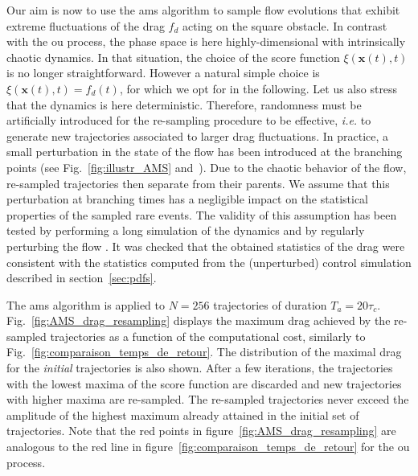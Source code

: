\documentclass{jfm}
\newcommand{\EL}[1]{{\color{myred}{#1}}}
\begin{document}
% 
% 
Our aim is now to use the \ac{ams} algorithm to sample flow evolutions that exhibit extreme fluctuations of the drag $f_d$ acting on the square obstacle.
In contrast with the \acl{ou} process, the phase space is here highly-dimensional with intrinsically chaotic dynamics.
In that situation, the choice of the score function $\xi (\mathbf{x}(t),t)$ is no longer straightforward.
However a natural simple choice is $\xi (\mathbf{x}(t),t) = f_d(t)$, for which we opt for in the following.
% 
{Let us also stress that the dynamics is here deterministic.
  Therefore, randomness must be artificially introduced for the re-sampling procedure to be effective, \textit{i.e.} to generate new trajectories associated to larger drag fluctuations.
  In practice, a small perturbation in the state of the flow has been introduced at the branching points (see Fig.~\ref{fig:illustr_AMS} and~\cite{wouters2016rare}).
  Due to the chaotic behavior of the flow, re-sampled trajectories then separate from their parents.
  We assume that this perturbation at branching times has a negligible impact on the statistical properties of the sampled rare events.
  The validity of this assumption has been tested by performing a long simulation of the dynamics and by regularly perturbing the flow \EL{(see Appendix \ref{app:perturb_branching_time})}.
  It was checked that the obtained statistics of the drag were consistent with the statistics computed from the (unperturbed) control simulation described in section~\ref{sec:pdfs}.}


% 
The \ac{ams} algorithm is applied to $N=256$ trajectories of duration $T_a = 20\tau_c$.
% 
Fig.~\ref{fig:AMS_drag_resampling} displays the maximum drag achieved by the re-sampled trajectories as a function of the computational cost, similarly to Fig.~\ref{fig:comparaison_temps_de_retour}.
% 
% 
The distribution of the maximal drag for the \textit{initial} trajectories is also shown.
After a few iterations, the trajectories with the lowest maxima of the score function are discarded and new trajectories with higher maxima are re-sampled.
The re-sampled trajectories never exceed the amplitude of the highest maximum already attained in the initial set of trajectories.
Note that the red points in figure~\ref{fig:AMS_drag_resampling} are analogous to the red line in figure~\ref{fig:comparaison_temps_de_retour} for the \ac{ou} process.
\end{document}
